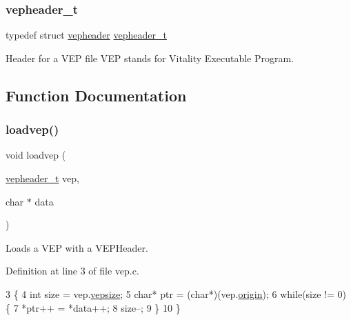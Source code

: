 \subsubsection{\texorpdfstring{vepheader\+\_\+t}{vepheader\_t}}
{\footnotesize\ttfamily typedef struct \hyperlink{a00080}{vepheader}  \hyperlink{a00062_a78392c340e1fe1be344df81d1438b74f_a78392c340e1fe1be344df81d1438b74f}{vepheader\+\_\+t}}



Header for a V\+EP file V\+EP stands for Vitality Executable Program. 



\subsection{Function Documentation}
\mbox{\label{a00062_afa2deaad59ce4809eed53e7aeb3ac31b_afa2deaad59ce4809eed53e7aeb3ac31b}} 
\subsubsection{\texorpdfstring{loadvep()}{loadvep()}}
{\footnotesize\ttfamily void loadvep (\begin{DoxyParamCaption}\item[{\hyperlink{a00062_a78392c340e1fe1be344df81d1438b74f_a78392c340e1fe1be344df81d1438b74f}{vepheader\+\_\+t}}]{vep,  }\item[{char $\ast$}]{data }\end{DoxyParamCaption})}



Loads a V\+EP with a V\+E\+P\+Header. 



Definition at line 3 of file vep.\+c.


\begin{DoxyCode}
3                                            \{
4     \textcolor{keywordtype}{int} size = vep.\hyperlink{a00080_a6121693fa5ac3673d831b440aea8963e_a6121693fa5ac3673d831b440aea8963e}{vepsize};
5     \textcolor{keywordtype}{char}* ptr = (\textcolor{keywordtype}{char}*)(vep.\hyperlink{a00080_aa81b6806dd33022ce60c314c908ba028_aa81b6806dd33022ce60c314c908ba028}{origin});
6     \textcolor{keywordflow}{while}(size != 0) \{
7         *ptr++ = *data++;
8         size--;
9     \}
10 \}
\end{DoxyCode}
